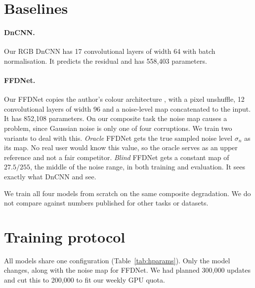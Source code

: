 \section{Baselines}\label{sec:baselines}

\paragraph{DnCNN.} Our RGB DnCNN has 17 convolutional layers of width 64
with batch normalisation. It predicts the residual and has 558,403
parameters.

\paragraph{FFDNet.} Our FFDNet copies the author's colour architecture
\cite{kair}, with a pixel unshuffle, 12 convolutional layers of width 96 and a
noise-level map concatenated to the input. It has 852,108 parameters. On our
composite task the noise map causes a problem, since Gaussian noise is only
one of four corruptions. We train two variants to deal with this.
\emph{Oracle} FFDNet gets the true sampled noise level $\sigma_n$ as its map.
No real user would know this value, so the oracle serves as an upper
reference and not a fair competitor. \emph{Blind} FFDNet gets a constant map
of $27.5/255$, the middle of the noise range, in both training and
evaluation. It sees exactly what DnCNN and \fcsg{} see.

We train all four models from scratch on the same composite degradation. We
do not compare against numbers published for other tasks or datasets.

\section{Training protocol}\label{sec:training}

All models share one configuration (Table~\ref{tab:hparams}). Only the model
changes, along with the noise map for FFDNet. We had planned 300,000 updates
and cut this to 200,000 to fit our weekly GPU quota.

